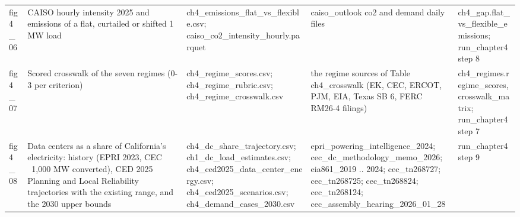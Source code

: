 \begin{tabular}{lp{4.6cm}p{5.2cm}p{4.6cm}p{4.8cm}}
fig4\_\allowbreak{}06 & CAISO hourly intensity 2025 and emissions of a flat, curtailed or shifted 1 MW load & ch4\_\allowbreak{}emissions\_\allowbreak{}flat\_\allowbreak{}vs\_\allowbreak{}flexible.csv; caiso\_\allowbreak{}co2\_\allowbreak{}intensity\_\allowbreak{}hourly.parquet & caiso\_\allowbreak{}outlook co2 and demand daily files & ch4\_\allowbreak{}gap.flat\_\allowbreak{}vs\_\allowbreak{}flexible\_\allowbreak{}emissions; run\_\allowbreak{}chapter4 step 8 \\
fig4\_\allowbreak{}07 & Scored crosswalk of the seven regimes (0-3 per criterion) & ch4\_\allowbreak{}regime\_\allowbreak{}scores.csv; ch4\_\allowbreak{}regime\_\allowbreak{}rubric.csv; ch4\_\allowbreak{}regime\_\allowbreak{}crosswalk.csv & the regime sources of Table ch4\_\allowbreak{}crosswalk (EK, CEC, ERCOT, PJM, EIA, Texas SB 6, FERC RM26-4 filings) & ch4\_\allowbreak{}regimes.regime\_\allowbreak{}scores, crosswalk\_\allowbreak{}matrix; run\_\allowbreak{}chapter4 step 7 \\
fig4\_\allowbreak{}08 & Data centers as a share of California's electricity: history (EPRI 2023, CEC ~1,000 MW converted), CED 2025 Planning and Local Reliability trajectories with the existing range, and the 2030 upper bounds & ch4\_\allowbreak{}dc\_\allowbreak{}share\_\allowbreak{}trajectory.csv; ch1\_\allowbreak{}dc\_\allowbreak{}load\_\allowbreak{}estimates.csv; ch4\_\allowbreak{}ced2025\_\allowbreak{}data\_\allowbreak{}center\_\allowbreak{}energy.csv; ch4\_\allowbreak{}ced2025\_\allowbreak{}scenarios.csv; ch4\_\allowbreak{}demand\_\allowbreak{}cases\_\allowbreak{}2030.csv & epri\_\allowbreak{}powering\_\allowbreak{}intelligence\_\allowbreak{}2024; cec\_\allowbreak{}dc\_\allowbreak{}methodology\_\allowbreak{}memo\_\allowbreak{}2026; eia861\_\allowbreak{}2019 .. 2024; cec\_\allowbreak{}tn268727; cec\_\allowbreak{}tn268725; cec\_\allowbreak{}tn268824; cec\_\allowbreak{}tn268124; cec\_\allowbreak{}assembly\_\allowbreak{}hearing\_\allowbreak{}2026\_\allowbreak{}01\_\allowbreak{}28 & run\_\allowbreak{}chapter4 step 9 \\
\bottomrule
\end{tabular}